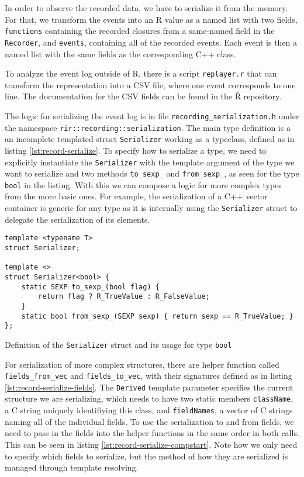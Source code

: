 In order to observe the recorded data, we have to serialize it from the memory. For that, we transform the events into an R value as a named list with two fields, \texttt{functions} containing the recorded closures from a same-named field in the \texttt{Recorder}, and \texttt{events}, containing all of the recorded events. Each event is then a named list with the same fields as the corresponding C++ class.

To analyze the event log outside of R, there is a script \texttt{replayer.r} that can transform the representation into a CSV file, where one event corresponds to one line. The documentation for the CSV fields can be found in the Ř repository\cite[documentation/recording.md]{rsh-github}.

The logic for serializing the event log is in file \texttt{recording\_serialization.h} under the namespace \texttt{rir::recording::serialization}. The main type definition is a an incomplete templated struct \texttt{Serializer} working as a typeclass, defined as in listing \ref{lst:record-serialize}. To specify how to serialize a type, we need to explicitly instantiate the \texttt{Serializer} with the template argument of the type we want to serialize and two methods \texttt{to\_sexp\_} and \texttt{from\_sexp\_}, as seen for the type \texttt{bool} in the listing. With this we can compose a logic for more complex types from the more basic ones. For example, the serialization of a C++ vector container is generic for any type as it is internally using the \texttt{Serializer} struct to delegate the serialization of its elements.

\begin{listing}
	\begin{verbatim}
template <typename T>
struct Serializer;

template <>
struct Serializer<bool> {
    static SEXP to_sexp_(bool flag) {
        return flag ? R_TrueValue : R_FalseValue;
    }
    static bool from_sexp_(SEXP sexp) { return sexp == R_TrueValue; }
};
  \end{verbatim}
	\caption{Definition of the \texttt{Serializer} struct and its usage for type \texttt{bool}}\label{lst:record-serialize}
\end{listing}

For serialization of more complex structures, there are helper function called \texttt{fields\_from\_vec} and \texttt{fields\_to\_vec}, with their signatures defined as in listing \ref{lst:record-serialize-fields}. The \texttt{Derived} template parameter specifies the current structure we are serializing, which needs to have two static members \texttt{className}, a C string uniquely identifiying this class, and \texttt{fieldNames}, a vector of C strings naming all of the individual fields. To use the serialization to and from fields, we need to pass in the fields into the helper functions in the same order in both calls. This can be seen in listing \ref{lst:record-serialize-compstart}. Note how we only need to specify which fields to serialize, but the method of how they are serialized is managed through template resolving.

